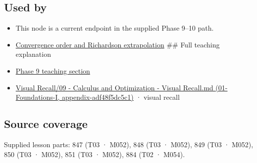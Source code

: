\subsection{Used by}\label{appendix-e2d7b4f2161d-used-by}

\begin{itemize}
\item
  This node is a current endpoint in the supplied Phase 9--10 path.
\item
  \hyperref[appendix-aca80b6bf17a]{Convergence order and Richardson extrapolation} \#\# Full teaching explanation
\item
  \hyperref[02-foundations-ii-ch022-numerical-differentiation-and-automatic-differentiation]{Phase 9 teaching section}
\item
  \href{../01-Foundations-I/main.pdf\#nameddest=appendix-adf48f5dc5c1}{Visual Recall/09 - Calculus and Optimization - Visual Recall.md (01-Foundations-I, appendix-adf48f5dc5c1)} · visual recall
\end{itemize}

\subsection{Source coverage}\label{appendix-e2d7b4f2161d-source-coverage}

Supplied lesson parts: 847 (T03 · M052), 848 (T03 · M052), 849 (T03 · M052), 850 (T03 · M052), 851 (T03 · M052), 884 (T02 · M054).
